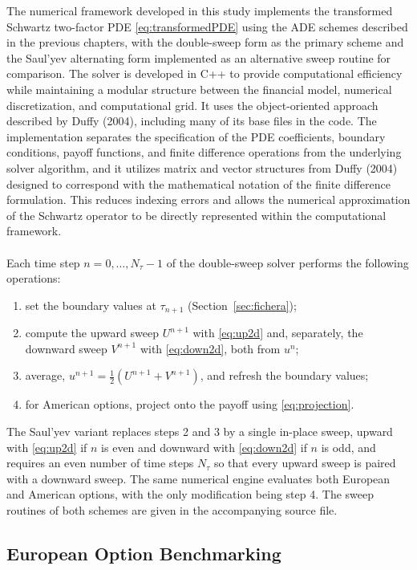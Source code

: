 \documentclass[12pt,a4paper]{article}
\begin{document}
The numerical framework developed in this study implements the transformed Schwartz two-factor PDE \eqref{eq:transformedPDE} using the ADE schemes described in the previous chapters, with the double-sweep form as the primary scheme and the Saul'yev alternating form implemented as an alternative sweep routine for comparison. The solver is developed in C++ to provide computational efficiency while maintaining a modular structure between the financial model, numerical discretization, and computational grid. It uses the object-oriented approach described by Duffy (2004), including many of its base files in the code. The implementation separates the specification of the PDE coefficients, boundary conditions, payoff functions, and finite difference operations from the underlying solver algorithm, and it utilizes matrix and vector structures from Duffy (2004) designed to correspond with the mathematical notation of the finite difference formulation. This reduces indexing errors and allows the numerical approximation of the Schwartz operator to be directly represented within the computational framework.\\\\
Each time step $n=0,\dots,N_\tau-1$ of the double-sweep solver performs the following operations:
\begin{enumerate}
\item set the boundary values at $\tau_{n+1}$ (Section~\ref{sec:fichera});
\item compute the upward sweep $U^{n+1}$ with \eqref{eq:up2d} and, separately, the downward sweep $V^{n+1}$ with \eqref{eq:down2d}, both from $u^n$;
\item average, $u^{n+1}=\tfrac12(U^{n+1}+V^{n+1})$, and refresh the boundary values;
\item for American options, project onto the payoff using \eqref{eq:projection}.
\end{enumerate}
The Saul'yev variant replaces steps 2 and 3 by a single in-place sweep, upward with \eqref{eq:up2d} if $n$ is even and downward with \eqref{eq:down2d} if $n$ is odd, and requires an even number of time steps $N_\tau$ so that every upward sweep is paired with a downward sweep. The same numerical engine evaluates both European and American options, with the only modification being step 4. The sweep routines of both schemes are given in the accompanying source file.

\subsection{European Option Benchmarking}
\end{document}
